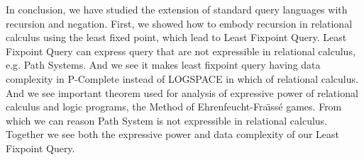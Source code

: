 In conclusion, we have studied the extension of standard query languages with recursion and negation. First, we showed how to embody recursion in relational calculus using the least fixed point, which lead to Least Fixpoint Query. Least Fixpoint Query can express query that are not expressible in relational calculus, e.g.  Path Systems. And we see it makes least fixpoint query having data complexity in P-Complete instead of LOGSPACE in which of relational calculus. And we see important theorem used for analysis of expressive power of relational calculus and logic programs, the Method of Ehrenfeucht-Fra\"ıss\'e games. From which we can reason Path System is not expressible in relational calculus. Together we see both the expressive power and data complexity of our Least Fixpoint Query. 